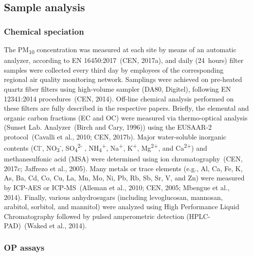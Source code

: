 \documentclass[
]{article}
\begin{document}
\hypertarget{sample-analysis}{%
\subsection{Sample analysis}\label{sample-analysis}}

\hypertarget{chemical-speciation}{%
\subsubsection{Chemical speciation}\label{chemical-speciation}}

The PM\textsubscript{10} concentration was measured at each site by
means of an automatic analyzer, according to EN 16450:2017~(CEN, 2017a),
and daily (24~hours) filter samples were collected every third day by
employees of the corresponding regional air quality monitoring network.
Samplings were achieved on pre-heated quartz fiber filters using
high-volume sampler (DA80, Digitel), following EN 12341:2014
procedures~(CEN, 2014). Off-line chemical analysis performed on these
filters are fully described in the respective papers. Briefly, the
elemental and organic carbon fractions (EC and OC) were measured via
thermo-optical analysis (Sunset Lab. Analyzer~(Birch and Cary, 1996))
using the EUSAAR-2 protocol~(Cavalli et al., 2010; CEN, 2017b). Major
water-soluble inorganic contents (Cl\textsuperscript{-},
NO\textsubscript{3}\textsuperscript{-},
SO\textsubscript{4}\textsuperscript{2-} ,
NH\textsubscript{4}\textsuperscript{+}, Na\textsuperscript{+},
K\textsuperscript{+}, Mg\textsuperscript{2+}, and
Ca\textsuperscript{2+}) and methanesulfonic acid (MSA) were determined
using ion chromatography~(CEN, 2017c; Jaffrezo et al., 2005). Many
metals or trace elements (e.g., Al, Ca, Fe, K, As, Ba, Cd, Co, Cu, La,
Mn, Mo, Ni, Pb, Rb, Sb, Sr, V, and Zn) were measured by ICP-AES or
ICP-MS~(Alleman et al., 2010; CEN, 2005; Mbengue et al., 2014). Finally,
various anhydrosugars (including levoglucosan, mannosan, arabitol,
sorbitol, and mannitol) were analyzed using High Performance Liquid
Chromatography followed by pulsed amperometric detection
(HPLC-PAD)~(Waked et al., 2014).

\hypertarget{op-assays}{%
\subsubsection{OP assays}\label{op-assays}}
\end{document}
